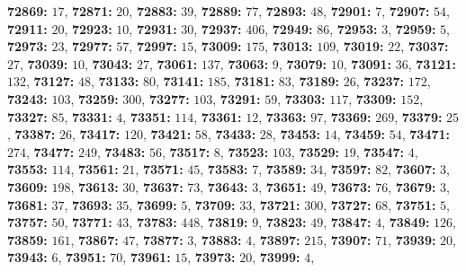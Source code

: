 \textsf{\bfseries 72869:} $17$, \textsf{\bfseries 72871:} $20$, \textsf{\bfseries 72883:} $39$, \textsf{\bfseries 72889:} $77$, \textsf{\bfseries 72893:} $48$, \textsf{\bfseries 72901:} $7$, \textsf{\bfseries 72907:} $54$, \textsf{\bfseries 72911:} $20$, \textsf{\bfseries 72923:} $10$, \textsf{\bfseries 72931:} $30$, \textsf{\bfseries 72937:} $406$, \textsf{\bfseries 72949:} $86$, \textsf{\bfseries 72953:} $3$, \textsf{\bfseries 72959:} $5$, \textsf{\bfseries 72973:} $23$, \textsf{\bfseries 72977:} $57$, \textsf{\bfseries 72997:} $15$, \textsf{\bfseries 73009:} $175$, \textsf{\bfseries 73013:} $109$, \textsf{\bfseries 73019:} $22$, \textsf{\bfseries 73037:} $27$, \textsf{\bfseries 73039:} $10$, \textsf{\bfseries 73043:} $27$, \textsf{\bfseries 73061:} $137$, \textsf{\bfseries 73063:} $9$, \textsf{\bfseries 73079:} $10$, \textsf{\bfseries 73091:} $36$, \textsf{\bfseries 73121:} $132$, \textsf{\bfseries 73127:} $48$, \textsf{\bfseries 73133:} $80$, \textsf{\bfseries 73141:} $185$, \textsf{\bfseries 73181:} $83$, \textsf{\bfseries 73189:} $26$, \textsf{\bfseries 73237:} $172$, \textsf{\bfseries 73243:} $103$, \textsf{\bfseries 73259:} $300$, \textsf{\bfseries 73277:} $103$, \textsf{\bfseries 73291:} $59$, \textsf{\bfseries 73303:} $117$, \textsf{\bfseries 73309:} $152$, \textsf{\bfseries 73327:} $85$, \textsf{\bfseries 73331:} $4$, \textsf{\bfseries 73351:} $114$, \textsf{\bfseries 73361:} $12$, \textsf{\bfseries 73363:} $97$, \textsf{\bfseries 73369:} $269$, \textsf{\bfseries 73379:} $25$, \textsf{\bfseries 73387:} $26$, \textsf{\bfseries 73417:} $120$, \textsf{\bfseries 73421:} $58$, \textsf{\bfseries 73433:} $28$, \textsf{\bfseries 73453:} $14$, \textsf{\bfseries 73459:} $54$, \textsf{\bfseries 73471:} $274$, \textsf{\bfseries 73477:} $249$, \textsf{\bfseries 73483:} $56$, \textsf{\bfseries 73517:} $8$, \textsf{\bfseries 73523:} $103$, \textsf{\bfseries 73529:} $19$, \textsf{\bfseries 73547:} $4$, \textsf{\bfseries 73553:} $114$, \textsf{\bfseries 73561:} $21$, \textsf{\bfseries 73571:} $45$, \textsf{\bfseries 73583:} $7$, \textsf{\bfseries 73589:} $34$, \textsf{\bfseries 73597:} $82$, \textsf{\bfseries 73607:} $3$, \textsf{\bfseries 73609:} $198$, \textsf{\bfseries 73613:} $30$, \textsf{\bfseries 73637:} $73$, \textsf{\bfseries 73643:} $3$, \textsf{\bfseries 73651:} $49$, \textsf{\bfseries 73673:} $76$, \textsf{\bfseries 73679:} $3$, \textsf{\bfseries 73681:} $37$, \textsf{\bfseries 73693:} $35$, \textsf{\bfseries 73699:} $5$, \textsf{\bfseries 73709:} $33$, \textsf{\bfseries 73721:} $300$, \textsf{\bfseries 73727:} $68$, \textsf{\bfseries 73751:} $5$, \textsf{\bfseries 73757:} $50$, \textsf{\bfseries 73771:} $43$, \textsf{\bfseries 73783:} $448$, \textsf{\bfseries 73819:} $9$, \textsf{\bfseries 73823:} $49$, \textsf{\bfseries 73847:} $4$, \textsf{\bfseries 73849:} $126$, \textsf{\bfseries 73859:} $161$, \textsf{\bfseries 73867:} $47$, \textsf{\bfseries 73877:} $3$, \textsf{\bfseries 73883:} $4$, \textsf{\bfseries 73897:} $215$, \textsf{\bfseries 73907:} $71$, \textsf{\bfseries 73939:} $20$, \textsf{\bfseries 73943:} $6$, \textsf{\bfseries 73951:} $70$, \textsf{\bfseries 73961:} $15$, \textsf{\bfseries 73973:} $20$, \textsf{\bfseries 73999:} $4$, 
